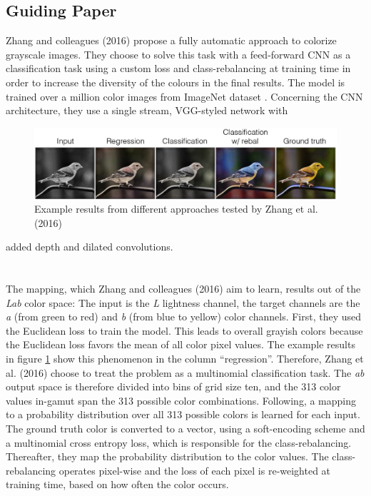 \documentclass[12pt,letterpaper]{article}
\begin{document}
\subsection{Guiding Paper} 
Zhang and colleagues (2016) propose a fully automatic approach to colorize grayscale images. They choose to solve this task with a feed-forward CNN as a classification task using a custom loss and class-rebalancing at training time in order to increase the diversity of the colours in the final results. The model is trained over a million color images from ImageNet dataset \citep{Russakovsky.2014}. Concerning the CNN architecture, they use a single stream, VGG-styled network with
\begin{figure}[h]
	\centering
	\includegraphics[width=1.0\textwidth]{zhang_pre.jpg}
	\caption{Example results from different approaches tested by Zhang et al. (2016)}
	\label{zhangpred}
\end{figure} added depth and dilated convolutions.\\\\\\
The mapping, which Zhang and colleagues (2016) aim to learn, results out of the \emph{Lab} color space: The input is the \emph{L} lightness channel, the target channels are the \emph{a} (from green to red) and \emph{b} (from blue to yellow) color channels. First, they used the Euclidean loss to train the model. This leads to overall grayish colors because the Euclidean loss favors the mean of all color pixel values. The example results in figure \ref{zhangpred} show this phenomenon in the column \enquote{regression}. Therefore, Zhang et al. (2016) choose to treat the problem as a multinomial classification task. The \emph{ab} output space is therefore divided into bins of grid size ten, and the 313 color values in-gamut span the 313 possible color combinations. Following, a mapping to a probability distribution over all 313 possible colors is learned for each input. The ground truth color is converted to a vector, using a soft-encoding scheme and a multinomial cross entropy loss, which is responsible for the class-rebalancing. Thereafter, they map the probability distribution to the color values. The class-rebalancing operates pixel-wise and the loss of each pixel is re-weighted at training time, based on how often the color occurs.
\newpage
\end{document}
